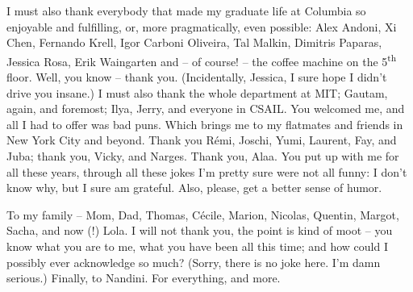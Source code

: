 I must also thank everybody that made my graduate life at Columbia so enjoyable and fulfilling, or, more pragmatically, even possible: Alex Andoni, Xi Chen, Fernando Krell, Igor Carboni Oliveira, Tal Malkin, Dimitris Paparas, Jessica Rosa, Erik Waingarten and -- of course! -- the coffee machine on the 5\textsuperscript{th} floor. Well, you know -- thank you. (Incidentally, Jessica, I sure hope I didn't drive you insane.) I must also thank the whole department at MIT; Gautam, again, and foremost; Ilya, Jerry, and everyone in CSAIL. You welcomed me, and all I had to offer was bad puns. Which brings me to my flatmates and friends in New York City and beyond. Thank you R\'emi, Joschi, Yumi, Laurent, Fay, and Juba; thank you, Vicky, and Narges. Thank you, Alaa. You put up with me for all these years, through all these jokes I'm pretty sure were not all funny: I don't know why, but I sure am grateful. Also, please, get a better sense of humor.

To my family -- Mom, Dad, Thomas, C\'{e}cile, Marion, Nicolas, Quentin, Margot, Sacha, and now (!) Lola. I will not thank you, the point is kind of moot -- you know what you are to me, what you have been all this time; and how could I possibly ever acknowledge so much? (Sorry, there is no joke here. I'm damn serious.)
Finally, to Nandini. For everything, and more.



%
